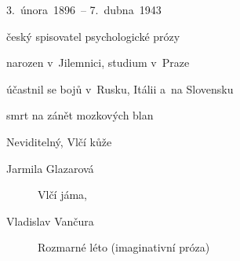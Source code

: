 {\parag{\getauthor}
\begin{compactitem}
	\item 3.~února~1896~-- 7.~dubna~1943
	\item český spisovatel psychologické prózy
	\item narozen v~Jilemnici, studium v~Praze
	\item účastnil se bojů v~Rusku, Itálii a~na Slovensku
	\item smrt na zánět mozkových blan
	\item Neviditelný, Vlčí kůže
\end{compactitem}

\begin{description}
	\item[Jarmila Glazarová] Vlčí jáma,
	\item[Vladislav Vančura] Rozmarné léto (imaginativní próza)
\end{description}
}
